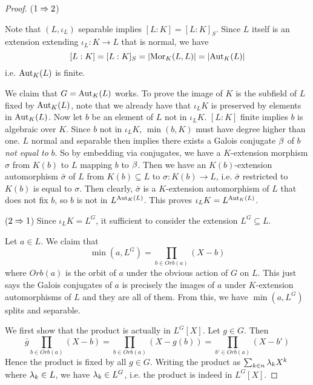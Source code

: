 \documentclass[../book.tex]{subfiles}
\begin{document}
\begin{proof}
    ($1\Rightarrow 2$)
        
        Note that $(L,\iota_L)$ separable implies $[L:K] = [L:K]_S$.
        Since $L$ itself is an extension extending $\iota_L : K \to L$ that is normal,
        we have \[
            [L : K] = [L : K]_S = |\text{Mor}_{K}(L, L)| = |\text{Aut}_{K}(L)|
        \]
        i.e. $\text{Aut}_{K}(L)$ is finite. 
        
        We claim that $G = \text{Aut}_{K}(L)$ works. 
        To prove the image of $K$ is the subfield of $L$ fixed by $\text{Aut}_{K}(L)$,
        note that we already have that $\iota_L K$ is preserved by elements 
        in $\text{Aut}_{K}(L)$.
        Now let $b$ be an element of $L$ not in $\iota_L K$. 
        $[L : K]$ finite implies $b$ is algebraic over $K$. 
        Since $b$ not in $\iota_L K$, $\min(b,K)$ must have degree higher than one. 
        $L$ normal and separable then implies 
        there exists a Galois conjugate $\beta$ of $b$ \emph{not equal to} $b$. 
        So by embedding via conjugates, 
        we have a $K$-extension morphism $\sigma$ 
        from $K(b)$ to $L$ mapping $b$ to $\beta$.
        Then we have an $K(b)$-extension automorphism $\bar{\sigma}$ of $L$
        from $K(b) \subseteq L$ to $\sigma : K(b) \to L$, 
        i.e. $\bar{\sigma}$ restricted to $K(b)$ is equal to $\sigma$. 
        Then clearly, $\bar{\sigma}$ is a $K$-extension automorphism of $L$
        that does not fix $b$, 
        so $b$ is not in $L^{\text{Aut}_{K}(L)}$.
        This proves $\iota_L K = L^{\text{Aut}_{K}(L)}$. 
        
    ($2\Rightarrow 1$)
        Since $\iota_L K = L^G$, it sufficient to consider the extension 
        $L^G \subseteq L$. 
        
        Let $a \in L$. We claim that \[
            \min(a,L^G) = \prod_{b \in Orb(a)} (X - b)
        \]
        where $Orb(a)$ is the orbit of $a$ under the obvious action of $G$ on $L$. 
        This just says the Galois conjugates of $a$ is precisely
        the images of $a$ under $K$-extension automorphisms of $L$
        and they are all of them.
        From this, we have $\min(a,L^G)$ splits and separable. 
    
        We first show that the product is actually in $L^G[X]$. 
        Let $g \in G$. Then \[
            \bar{g} \prod_{b \in Orb(a)} (X - b) 
            = \prod_{b \in Orb(a)} (X - g(b)) = \prod_{b' \in Orb(a)} (X - b')
        \]
        Hence the product is fixed by all $g \in G$. 
        Writing the product as $\sum_{k\in n} \lambda_k X^k$ where $\lambda_k \in L$,
        we have $\lambda_k \in L^G$, i.e. the product is indeed in $L^G[X]$. 
        

\end{proof}
\end{document}
